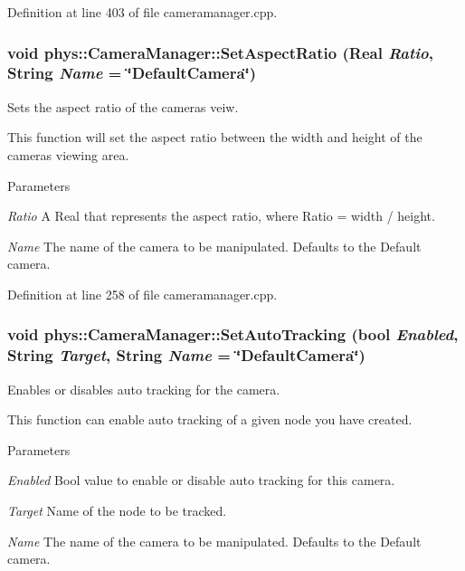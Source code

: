 Definition at line 403 of file cameramanager.cpp.

\hypertarget{classphys_1_1CameraManager_af16862039fffd900b9c7acc20527cac8}{
\subsubsection[{SetAspectRatio}]{\setlength{\rightskip}{0pt plus 5cm}void phys::CameraManager::SetAspectRatio ({\bf Real} {\em Ratio}, \/  {\bf String} {\em Name} = {\ttfamily \char`\"{}DefaultCamera\char`\"{}})}}
\label{d9/d91/classphys_1_1CameraManager_af16862039fffd900b9c7acc20527cac8}


Sets the aspect ratio of the cameras veiw. 

This function will set the aspect ratio between the width and height of the cameras viewing area. 
\begin{DoxyParams}{Parameters}
\item[{\em Ratio}]A Real that represents the aspect ratio, where Ratio = width / height. \item[{\em Name}]The name of the camera to be manipulated. Defaults to the Default camera. \end{DoxyParams}


Definition at line 258 of file cameramanager.cpp.

\hypertarget{classphys_1_1CameraManager_a6edd94b6e8d9f2fa1e0b84554b367933}{
\subsubsection[{SetAutoTracking}]{\setlength{\rightskip}{0pt plus 5cm}void phys::CameraManager::SetAutoTracking (bool {\em Enabled}, \/  {\bf String} {\em Target}, \/  {\bf String} {\em Name} = {\ttfamily \char`\"{}DefaultCamera\char`\"{}})}}
\label{d9/d91/classphys_1_1CameraManager_a6edd94b6e8d9f2fa1e0b84554b367933}


Enables or disables auto tracking for the camera. 

This function can enable auto tracking of a given node you have created. 
\begin{DoxyParams}{Parameters}
\item[{\em Enabled}]Bool value to enable or disable auto tracking for this camera. \item[{\em Target}]Name of the node to be tracked. \item[{\em Name}]The name of the camera to be manipulated. Defaults to the Default camera. \end{DoxyParams}


